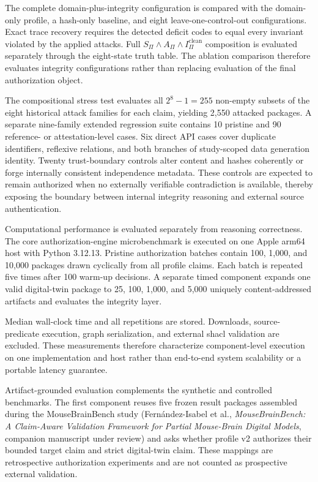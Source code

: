 \documentclass[11pt,a4paper]{article}
\newcommand{\MouseBrainBenchCompanion}{Fern\'andez-Isabel et al., \emph{MouseBrainBench: A Claim-Aware Validation Framework for Partial Mouse-Brain Digital Models}, companion manuscript under review}
\begin{document}
The complete domain-plus-integrity configuration is compared with the domain-only profile, a hash-only baseline, and eight leave-one-control-out configurations. Exact trace recovery requires the detected deficit codes to equal every invariant violated by the applied attacks. Full $S_{\Pi}\land A_{\Pi}\land I^{\mathrm{clean}}_{\Pi}$ composition is evaluated separately through the eight-state truth table. The ablation comparison therefore evaluates integrity configurations rather than replacing evaluation of the final authorization object.

The compositional stress test evaluates all $2^8-1=255$ non-empty subsets of the eight historical attack families for each claim, yielding 2,550 attacked packages. A separate nine-family extended regression suite contains 10 pristine and 90 reference- or attestation-level cases. Six direct API cases cover duplicate identifiers, reflexive relations, and both branches of study-scoped data generation identity. Twenty trust-boundary controls alter content and hashes coherently or forge internally consistent independence metadata. These controls are expected to remain authorized when no externally verifiable contradiction is available, thereby exposing the boundary between internal integrity reasoning and external source authentication.

Computational performance is evaluated separately from reasoning correctness. The core authorization-engine microbenchmark is executed on one Apple arm64 host with Python 3.12.13. Pristine authorization batches contain 100, 1,000, and 10,000 packages drawn cyclically from all profile claims. Each batch is repeated five times after 100 warm-up decisions. A separate timed component expands one valid digital-twin package to 25, 100, 1,000, and 5,000 uniquely content-addressed artifacts and evaluates the integrity layer.

Median wall-clock time and all repetitions are stored. Downloads, source-predicate execution, graph serialization, and external \ac{shacl} validation are excluded. These measurements therefore characterize component-level execution on one implementation and host rather than end-to-end system scalability or a portable latency guarantee.

Artifact-grounded evaluation complements the synthetic and controlled benchmarks. The first component reuses five frozen result packages assembled during the MouseBrainBench study
(\MouseBrainBenchCompanion) and asks whether profile v2 authorizes their bounded target claim and strict digital-twin claim. These mappings are retrospective authorization experiments and are not counted as prospective external validation.
\end{document}
